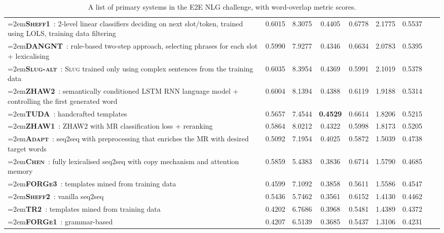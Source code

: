 \documentclass[11pt,a4paper]{article}
\newcommand\slug{\textsc{Slug}\xspace}
\newcommand\slugalt{\textsc{Slug-alt}\xspace}
\newcommand\zhawi{\textsc{ZHAW1}\xspace}
\newcommand\zhawii{\textsc{ZHAW2}\xspace}
\newcommand\adapt{\textsc{Adapt}\xspace}
\newcommand\dangnt{\textsc{DANGNT}\xspace}
\newcommand\forgei{\textsc{FORGe1}\xspace}
\newcommand\forgeiii{\textsc{FORGe3}\xspace}
\newcommand\sheffi{\textsc{Sheff1}\xspace}
\newcommand\sheffii{\textsc{Sheff2}\xspace}
\newcommand\chen{\textsc{Chen}\xspace}
\newcommand\thomsonii{\textsc{TR2}\xspace}
\newcommand\tuda{\textsc{TUDA}\xspace}
\newcommand{\symbseq}{}
\newcommand{\symbdd}{}
\newcommand{\symbrule}{}
\newcommand{\symbtempl}{}
\newcommand\Cslugalt{\textcolor{seqtoseq}{\symbseq\bf \slugalt}}
\newcommand\Czhawi{\textcolor{datadriven}{\symbdd\bf \zhawi}}
\newcommand\Czhawii{\textcolor{datadriven}{\symbdd\bf \zhawii}}
\newcommand\Cadapt{\textcolor{seqtoseq}{\symbseq\bf \adapt}}
\newcommand\Cdangnt{\textcolor{rules}{\symbrule\bf \dangnt}}
\newcommand\Cforgei{\textcolor{rules}{\symbrule\bf \forgei}}
\newcommand\Cforgeiii{\textcolor{templates}{\symbtempl\bf \forgeiii}}
\newcommand\Csheffi{\textcolor{datadriven}{\symbdd\bf \sheffi}}
\newcommand\Csheffii{\textcolor{seqtoseq}{\symbseq\bf \sheffii}}
\newcommand\Cchen{\textcolor{seqtoseq}{\symbseq\bf \chen}}
\newcommand\Cthomsonii{\textcolor{templates}{\symbtempl\bf \thomsonii}}
\newcommand\Ctuda{\textcolor{templates}{\symbtempl\bf \tuda}}
\begin{document}
\begin{table*}[t]
\begin{center}
\begin{tabular}{>{\hspace{-1mm}\raggedright\hangindent=2em\arraybackslash}m{8.8cm}>{\hspace{-1mm}}cccccccc}
\Csheffi~\cite{chen_shefeld_2018}: 2-level linear classifiers deciding on next slot/token, trained using LOLS, training data filtering & 0.6015  & 8.3075  & 0.4405  & 0.6778  & 2.1775 & 0.5537 \\
\Cdangnt~\cite{nguyen_structure-based_2018}: rule-based two-step approach, selecting phrases for each slot + lexicalising  & 0.5990  & 7.9277  & 0.4346  & 0.6634  & 2.0783 & 0.5395 \\
\Cslugalt~\cite[\emph{late submission,}][]{juraska_slug2slug:_2018}: \slug trained only using complex sentences from the training data & 0.6035  & 8.3954  & 0.4369  & 0.5991  & 2.1019 & 0.5378 \\
\Czhawii~\cite{deriu_end--end_2018}: semantically conditioned LSTM RNN language model \cite{wen:emnlp2015} + controlling the first generated word  & 0.6004  & 8.1394  & 0.4388  & 0.6119  & 1.9188 & 0.5314 \\
\Ctuda~\cite{puzikov_e2e_2018}: handcrafted templates   & 0.5657  & 7.4544  & \bf 0.4529  & 0.6614  & 1.8206 & 0.5215 \\
\Czhawi~\cite{deriu_end--end_2018}: \zhawii with MR classification loss + reranking  & 0.5864  & 8.0212  & 0.4322  & 0.5998  & 1.8173 & 0.5205 \\
\Cadapt~\cite{elder_e2e_2018}: seq2seq with preprocessing that enriches the MR with desired target words & 0.5092  & 7.1954  & 0.4025  & 0.5872  & 1.5039 & 0.4738 \\
\Cchen~\cite{chen_general_2018}: fully lexicalised seq2seq with copy mechanism and attention memory  & 0.5859  & 5.4383  & 0.3836  & 0.6714  & 1.5790 & 0.4685 \\
\Cforgeiii~\cite{mille_forge_2018}: templates mined from training data   & 0.4599  & 7.1092  & 0.3858  & 0.5611  & 1.5586 & 0.4547 \\
\Csheffii~\cite{chen_shefeld_2018}: vanilla seq2seq  & 0.5436  & 5.7462  & 0.3561  & 0.6152  & 1.4130 & 0.4462 \\
\Cthomsonii~\cite{schilder_e2e_2018}: templates mined from training data   & 0.4202  & 6.7686  & 0.3968  & 0.5481  & 1.4389 & 0.4372 \\
\Cforgei~\cite{mille_forge_2018}: grammar-based  & 0.4207  & 6.5139  & 0.3685  & 0.5437  & 1.3106 & 0.4231 \\
\end{tabular}\end{center}
\caption{A list of primary systems in the E2E NLG challenge, with word-overlap metric scores.}
\label{tab:primary-systems-wbms}


\end{table*}
\end{document}

